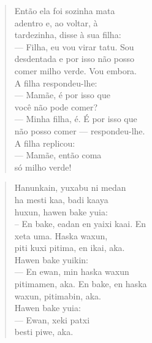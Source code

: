 \begin{verse}
Então ela foi sozinha mata\\
adentro e, ao voltar, à\\
tardezinha, disse à sua filha:\\
— Filha, eu vou virar tatu. Sou\\
desdentada e por isso não posso\\
comer milho verde. Vou embora.\\
A filha respondeu-lhe:\\
— Mamãe, é por isso que\\
você não pode comer?\\
— Minha filha, é. É por isso que\\
não posso comer — respondeu-lhe.\\
A filha replicou:\\
— Mamãe, então coma\\
só milho verde!
\end{verse}

\begin{verse}
Hanunkain, yuxabu ni medan\\
ha mesti kaa, badi kaaya\\
huxun, hawen bake yuia:\\
– En bake, eadan en yaixi kaai. En\\
xeta uma. Haska waxun,\\
piti kuxi pitima, en ikai, aka.\\
Hawen bake yuikin:\\
— En ewan, min haska waxun\\
pitimamen, aka. En bake, en haska\\
waxun, pitimabin, aka.\\
Hawen bake yuia:\\
— Ewan, xeki patxi\\
besti piwe, aka.
\end{verse}

\vspace*{\fill}

